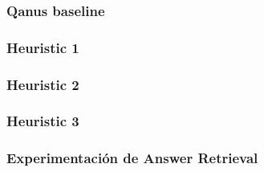 \subsubsection{Qanus baseline}
\subsubsection{Heuristic 1}
\subsubsection{Heuristic 2}
\subsubsection{Heuristic 3}
\subsubsection{Experimentación de Answer Retrieval}




